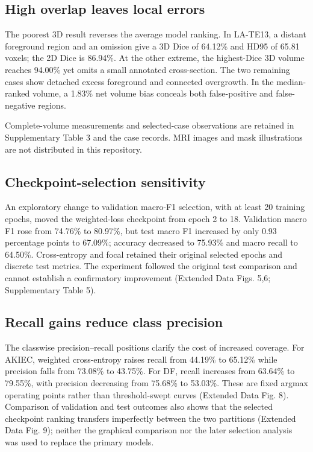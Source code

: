 \documentclass[11pt,a4paper]{article}
\begin{document}
\subsection*{High overlap leaves local errors}

The poorest 3D result reverses the average model ranking. In LA-TE13, a distant foreground region and an omission give a 3D Dice of 64.12\% and HD95 of 65.81 voxels; the 2D Dice is 86.94\%. At the other extreme, the highest-Dice 3D volume reaches 94.00\% yet omits a small annotated cross-section. The two remaining cases show detached excess foreground and connected overgrowth. In the median-ranked volume, a 1.83\% net volume bias conceals both false-positive and false-negative regions.



Complete-volume measurements and selected-case observations are retained in Supplementary Table 3 and the case records. MRI images and mask illustrations are not distributed in this repository.



\subsection*{Checkpoint-selection sensitivity}

An exploratory change to validation macro-F1 selection, with at least 20 training epochs, moved the weighted-loss checkpoint from epoch 2 to 18. Validation macro F1 rose from 74.76\% to 80.97\%, but test macro F1 increased by only 0.93 percentage points to 67.09\%; accuracy decreased to 75.93\% and macro recall to 64.50\%. Cross-entropy and focal retained their original selected epochs and discrete test metrics. The experiment followed the original test comparison and cannot establish a confirmatory improvement (Extended Data Figs. 5,6; Supplementary Table 5).



\subsection*{Recall gains reduce class precision}

The classwise precision–recall positions clarify the cost of increased coverage. For AKIEC, weighted cross-entropy raises recall from 44.19\% to 65.12\% while precision falls from 73.08\% to 43.75\%. For DF, recall increases from 63.64\% to 79.55\%, with precision decreasing from 75.68\% to 53.03\%. These are fixed argmax operating points rather than threshold-swept curves (Extended Data Fig. 8). Comparison of validation and test outcomes also shows that the selected checkpoint ranking transfers imperfectly between the two partitions (Extended Data Fig. 9); neither the graphical comparison nor the later selection analysis was used to replace the primary models.
\end{document}
